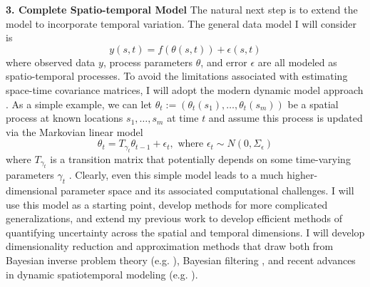 \documentclass[12pt]{article}
\begin{document}
  \textbf{3. Complete Spatio-temporal Model}
   The natural next step is to extend the model to incorporate temporal variation. The general data model I will consider is 
  \[y(s, t) = f(\theta(s, t)) + \epsilon(s, t)\]
  where observed data $y$, process parameters $\theta$, and error $\epsilon$ are all modeled as spatio-temporal processes. 
  To avoid the limitations associated with estimating space-time covariance matrices, I will adopt the modern dynamic model approach \cite{Arab}. As a simple example, 
  we can let $\theta_t := (\theta_t (s_1), \dots, \theta_t (s_m))$ be a spatial process at known locations $s_1, \dots, s_m$ at time $t$ and assume this process is updated
  via the Markovian linear model
  \[\theta_t = T_{\gamma_t} \theta_{t - 1} + \epsilon_t, \text{ where } \epsilon_t \sim N(0, \Sigma_\epsilon)\]
  where $T_{\gamma_t}$ is a transition matrix that potentially depends on some time-varying parameters $\gamma_t$ \cite{Arab}. Clearly, even this simple model leads to a 
  much higher-dimensional parameter space and its associated computational challenges. I will use this model as a starting point, develop methods for more
  complicated generalizations, and extend my previous work to develop efficient methods of quantifying uncertainty across the spatial and temporal dimensions. 
  I will develop dimensionality reduction and approximation methods that draw both from Bayesian inverse problem theory (e.g. \cite{Kugler}), Bayesian filtering \cite{Sarkka},
  and recent advances in dynamic spatiotemporal modeling (e.g. \cite{Hefley}). 
\end{document}

